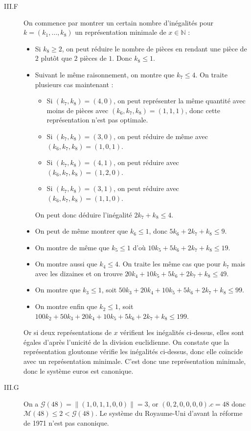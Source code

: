 \documentclass{article}
\newcommand{\N}{\mathbb{N}}
\newcommand{\M}{\mathscr{M}}
\newcommand{\G}{\mathscr{G}}
\newcommand{\norm}[1]{\|#1\|}
\newcommand{\scal}{.}
\begin{document}
\begin{description}
    \item[III.F] On commence par montrer un certain nombre d'inégalités pour $k=(k_1,\ldots,k_8)$ un représentation minimale de $x\in\N$ :\begin{itemize}
            \item Si $k_8\geq 2$, on peut réduire le nombre de pièces en rendant une pièce de $2$ plutôt que $2$ pièces de $1$. Donc $k_8\leq 1$.
            \item Suivant le même raisonnement, on montre que $k_7\leq 4$. On traite plusieurs cas maintenant :\begin{itemize}
                    \item Si $(k_7,k_8) = (4,0)$, on peut représenter la même quantité avec moins de pièces avec $(k_6, k_7, k_8) = (1, 1, 1)$, donc cette représentation n'est pas optimale.
                    \item Si $(k_7,k_8) = (3,0)$, on peut réduire de même avec $(k_6,k_7,k_8) = (1, 0, 1)$.
                    \item Si $(k_7,k_8) = (4,1)$, on peut réduire avec $(k_6,k_7,k_8) = (1,2,0)$.
                    \item Si $(k_7,k_8) = (3,1)$, on peut réduire avec $(k_6,k_7,k_8) = (1,1,0)$.
                \end{itemize}
                On peut donc déduire l'inégalité $2k_7 + k_8 \leq 4$.
            \item On peut de même montrer que $k_6\leq 1$, donc $5k_6 + 2k_7 + k_8 \leq 9$.
            \item On montre de même que $k_5\leq 1$ d'où $10k_5 + 5k_6 + 2k_7 + k_8 \leq 19$.
            \item On montre aussi que $k_4 \leq 4$. On traite les même cas que pour $k_7$ mais avec les dizaines et on trouve $20k_4 + 10k_5 + 5k_6 + 2k_7 + k_8 \leq 49$.
            \item On montre que $k_3 \leq 1$, soit $50k_3 + 20k_4 + 10k_5 + 5k_6 + 2k_7 + k_8 \leq 99$.
            \item On montre enfin que $k_2 \leq 1$, soit $100k_2 + 50k_3 + 20k_4 + 10k_5 + 5k_6 + 2k_7 + k_8 \leq 199$.
        \end{itemize}

        Or si deux représentations de $x$ vérifient les inégalités ci-dessus, elles sont égales d'après l'unicité de la division euclidienne. On constate que la représentation gloutonne vérifie les inégalités ci-dessus, donc elle coïncide avec un représentation minimale. C'est donc une représentation minimale, donc le système euros est canonique.

    \item[III.G] On a $\G(48) = \norm{(1, 0, 1, 1, 0, 0)} = 3$, or $(0, 2, 0, 0, 0, 0)\scal c = 48$ donc $\M(48) \leq 2 < \G(48)$. Le système du Royaume-Uni d'avant la réforme de 1971 n'est pas canonique.
\end{description}
\end{document}
